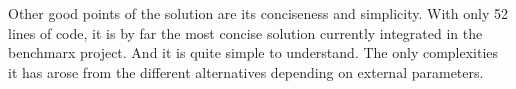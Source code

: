\documentclass[a4paper]{article}
\begin{document}
Other good points of the solution are its conciseness and simplicity.  With
only 52 lines of code, it is by far the most concise solution currently
integrated in the benchmarx project.  And it is quite simple to understand.
The only complexities it has arose from the different alternatives depending on
external parameters.



\end{document}
